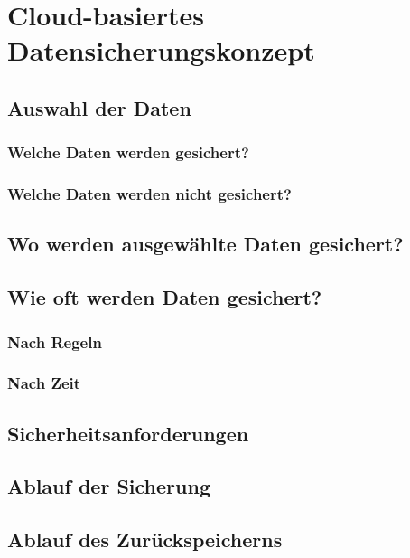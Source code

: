 \chapter{Cloud-basiertes Datensicherungskonzept}
\section{Auswahl der Daten}
\subsection{Welche Daten werden gesichert?}
\subsection{Welche Daten werden nicht gesichert?}

\section{Wo werden ausgewählte Daten gesichert?}

\section{Wie oft werden Daten gesichert?}
	\subsection{Nach Regeln}
	\subsection{Nach Zeit}

\section{Sicherheitsanforderungen}

\section{Ablauf der Sicherung}

\section{Ablauf des Zurückspeicherns}
